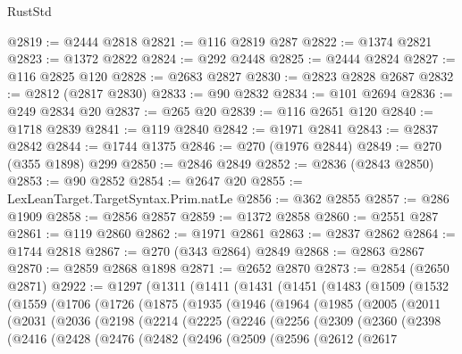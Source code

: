 \begin{lexlean}{RustStd}
\begin{coremodule}
@2819 := @2444 @2818
@2821 := @116 @2819 @287
@2822 := @1374 @2821
@2823 := @1372 @2822
@2824 := @292 @2448
@2825 := @2444 @2824
@2827 := @116 @2825 @120
@2828 := @2683 @2827
@2830 := @2823 @2828 @2687
@2832 := @2812 (@2817 @2830)
@2833 := @90 @2832
@2834 := @101 @2694
@2836 := @249 @2834 @20
@2837 := @265 @20
@2839 := @116 @2651 @120
@2840 := @1718 @2839
@2841 := @119 @2840
@2842 := @1971 @2841
@2843 := @2837 @2842
@2844 := @1744 @1375
@2846 := @270 (@1976 @2844)
@2849 := @270 (@355 @1898) @299
@2850 := @2846 @2849
@2852 := @2836 (@2843 @2850)
@2853 := @90 @2852
@2854 := @2647 @20
@2855 := LexLeanTarget.TargetSyntax.Prim.natLe
@2856 := @362 @2855
@2857 := @286 @1909
@2858 := @2856 @2857
@2859 := @1372 @2858
@2860 := @2551 @287
@2861 := @119 @2860
@2862 := @1971 @2861
@2863 := @2837 @2862
@2864 := @1744 @2818
@2867 := @270 (@343 @2864) @2849
@2868 := @2863 @2867
@2870 := @2859 @2868 @1898
@2871 := @2652 @2870
@2873 := @2854 (@2650 @2871)
@2922 := @1297
    (@1311
      (@1411
        (@1431
          (@1451
            (@1483
              (@1509
                (@1532
                  (@1559
                    (@1706
                      (@1726
                        (@1875
                          (@1935
                            (@1946
                              (@1964
                                (@1985
                                  (@2005
                                    (@2011
                                      (@2031
                                        (@2036
                                          (@2198
                                            (@2214
                                              (@2225
                                                (@2246
                                                  (@2256
                                                    (@2309
                                                      (@2360
                                                        (@2398
                                                          (@2416
                                                            (@2428
                                                              (@2476
                                                                (@2482
                                                                  (@2496
                                                                    (@2509
                                                                      (@2596
                                                                        (@2612
                                                                          (@2617

\end{coremodule}
\end{lexlean}
